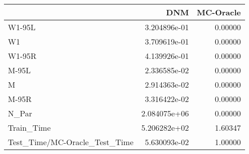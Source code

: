 \begin{tabular}{lrr}
\toprule
{} &           DNM &  MC-Oracle \\
\midrule
W1-95L                        &  3.204896e-01 &    0.00000 \\
W1                            &  3.709619e-01 &    0.00000 \\
W1-95R                        &  4.139926e-01 &    0.00000 \\
M-95L                         &  2.336585e-02 &    0.00000 \\
M                             &  2.914363e-02 &    0.00000 \\
M-95R                         &  3.316422e-02 &    0.00000 \\
N\_Par                         &  2.084075e+06 &    0.00000 \\
Train\_Time                    &  5.206282e+02 &    1.60347 \\
Test\_Time/MC-Oracle\_Test\_Time &  5.630093e-02 &    1.00000 \\
\bottomrule
\end{tabular}
